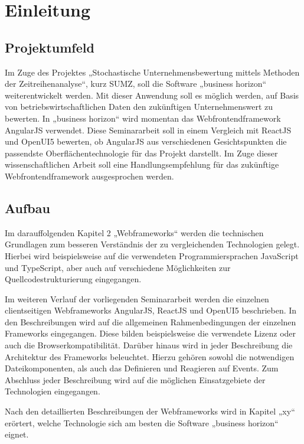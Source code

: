 
\chapter{Einleitung}

\section{Projektumfeld}

Im Zuge des Projektes „Stochastische Unternehmensbewertung mittels Methoden der Zeitreihenanalyse“, kurz SUMZ, soll die Software „business horizon“ weiterentwickelt werden. Mit dieser Anwendung soll es möglich werden, auf Basis von betriebswirtschaftlichen Daten den zukünftigen Unternehmenswert zu bewerten. In „business horizon“ wird momentan das Webfrontendframework AngularJS verwendet. Diese Seminararbeit soll in einem Vergleich mit ReactJS und OpenUI5 bewerten, ob AngularJS aus verschiedenen Gesichtspunkten die passendste Oberflächentechnologie für das Projekt darstellt. Im Zuge dieser wissenschaftlichen Arbeit soll eine Handlungsempfehlung für das zukünftige Webfrontendframework ausgesprochen werden.

\section{Aufbau}

Im darauffolgenden Kapitel 2 „Webframeworks“ werden die technischen Grundlagen zum besseren Verständnis der zu vergleichenden Technologien  gelegt. Hierbei wird beispielsweise auf die verwendeten Programmiersprachen JavaScript und TypeScript, aber auch auf verschiedene Möglichkeiten zur Quellcodestrukturierung eingegangen. 

Im weiteren Verlauf der vorliegenden Seminararbeit werden die einzelnen clientseitigen Webframeworks AngularJS, ReactJS und OpenUI5 beschrieben. In den Beschreibungen wird auf die allgemeinen Rahmenbedingungen der einzelnen Frameworks eingegangen. Diese bilden beispielsweise die verwendete Lizenz oder auch die Browserkompatibilität. Darüber hinaus wird in jeder Beschreibung die Architektur des Frameworks beleuchtet. Hierzu gehören sowohl die notwendigen Dateikomponenten, als auch das Definieren und Reagieren auf Events. Zum Abschluss jeder Beschreibung wird auf die möglichen Einsatzgebiete der Technologien eingegangen.

Nach den detaillierten Beschreibungen der Webframeworks wird in Kapitel „xy“ erörtert, welche Technologie sich am besten die Software „business horizon“ eignet.